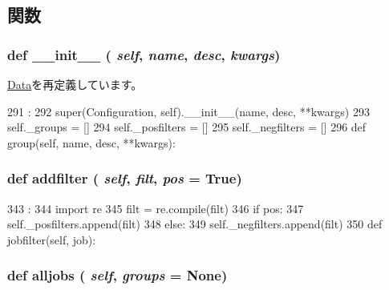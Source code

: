 \subsection{関数}
\hypertarget{classm5_1_1util_1_1jobfile_1_1Configuration_ac775ee34451fdfa742b318538164070e}{
\subsubsection[{\_\-\_\-init\_\-\_\-}]{\setlength{\rightskip}{0pt plus 5cm}def \_\-\_\-init\_\-\_\- ( {\em self}, \/   {\em name}, \/   {\em desc}, \/   {\em kwargs})}}
\label{classm5_1_1util_1_1jobfile_1_1Configuration_ac775ee34451fdfa742b318538164070e}


\hyperlink{classm5_1_1util_1_1jobfile_1_1Data_ac775ee34451fdfa742b318538164070e}{Data}を再定義しています。


\begin{DoxyCode}
291                                             :
292         super(Configuration, self).__init__(name, desc, **kwargs)
293         self._groups = []
294         self._posfilters = []
295         self._negfilters = []
296 
    def group(self, name, desc, **kwargs):
\end{DoxyCode}
\hypertarget{classm5_1_1util_1_1jobfile_1_1Configuration_a7f0e011749a02d5cdba83b0a6b263a73}{
\subsubsection[{addfilter}]{\setlength{\rightskip}{0pt plus 5cm}def addfilter ( {\em self}, \/   {\em filt}, \/   {\em pos} = {\ttfamily True})}}
\label{classm5_1_1util_1_1jobfile_1_1Configuration_a7f0e011749a02d5cdba83b0a6b263a73}



\begin{DoxyCode}
343                                        :
344         import re
345         filt = re.compile(filt)
346         if pos:
347             self._posfilters.append(filt)
348         else:
349             self._negfilters.append(filt)
350 
    def jobfilter(self, job):
\end{DoxyCode}
\hypertarget{classm5_1_1util_1_1jobfile_1_1Configuration_a0b74c8b88cfea4816e4710e34532c213}{
\subsubsection[{alljobs}]{\setlength{\rightskip}{0pt plus 5cm}def alljobs ( {\em self}, \/   {\em groups} = {\ttfamily None})}}
\label{classm5_1_1util_1_1jobfile_1_1Configuration_a0b74c8b88cfea4816e4710e34532c213}



